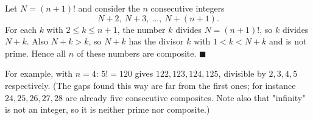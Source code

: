 Let $N=(n+1)!$ and consider the $n$ consecutive integers
\[
N+2,\ N+3,\ \dots,\ N+(n+1).
\]
For each $k$ with $2\le k\le n+1$, the number $k$ divides $N=(n+1)!$, so $k$ divides $N+k$. Also $N+k>k$, so $N+k$ has the divisor $k$ with $1<k<N+k$ and is not prime. Hence all $n$ of these numbers are composite. $\blacksquare$

For example, with $n=4$: $5!=120$ gives $122,123,124,125$, divisible by $2,3,4,5$ respectively. (The gaps found this way are far from the first ones; for instance $24,25,26,27,28$ are already five consecutive composites. Note also that "infinity" is not an integer, so it is neither prime nor composite.)

